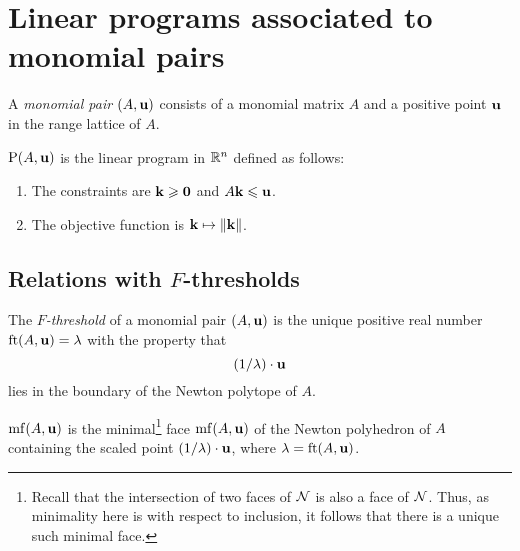 \documentclass[11pt]{amsart}
\begin{document}
\newpage



\section{Linear programs associated to monomial pairs}


\begin{definition}
A \emph{monomial pair} $(A, \mathbf{u})$ consists of a monomial matrix $A$ and a positive point $\mathbf{u}$ in the range lattice of $A$.
\end{definition}


\begin{definition}
$\mathrm{P}(A, \mathbf{u})$ is the linear program in $\mathbb{R}^n$ defined as follows:
\begin{enumerate}
\item The constraints are $\mathbf{k} \geqslant \mathbf{0}$ and $A \mathbf{k} \leqslant \mathbf{u}$.
\item The objective function is $\mathbf{k} \mapsto \| \mathbf{k} \|$.
\end{enumerate}
\end{definition}




\subsection{Relations with $F$-thresholds}
\label{opt sets: SS}

\begin{definition}
The \emph{$F$-threshold} of a monomial pair $(A, \mathbf{u})$ is the unique positive real number $\operatorname{ft}(A, \mathbf{u}) = \lambda$ with the property that  \[ (1/\lambda)  \cdot \mathbf{u}  \] 
lies in the boundary of the Newton polytope of $A$.  
\end{definition}

\begin{definition}
$\operatorname{mf}(A, \mathbf{u})$ is the minimal\footnote{Recall that the intersection of two faces of $\mathcal{N}$ is also a face of $\mathcal{N}$. Thus, as minimality here is with respect to inclusion, it follows that there is a unique such minimal face.} face $\operatorname{mf}(A, \mathbf{u})$ of the Newton polyhedron of $A$ containing the scaled point $(1/\lambda) \cdot \mathbf{u}$, where $\lambda = \operatorname{ft}(A, \mathbf{u})$.
\end{definition}
\end{document}
